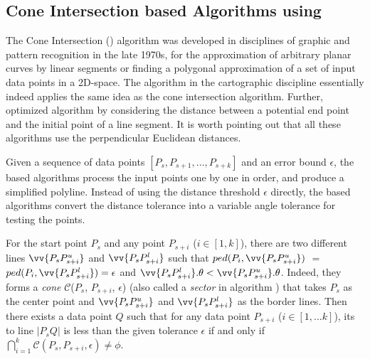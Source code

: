 \subsection{Cone Intersection based Algorithms using \ped}


The Cone Intersection (\cia) algorithm \cite{Williams:Longest, Sklansky:Cone} was developed in disciplines of graphic and pattern recognition in the late 1970s, for the approximation of arbitrary planar curves by linear segments or finding a polygonal approximation of a set of input data points in a 2D-space. The \sleeve algorithm \cite{Zhao:Sleeve} in the cartographic discipline essentially indeed applies the same idea as the cone intersection algorithm.
Further, \cite{Dunham:Cone}  optimized algorithm \cia by considering the distance between a potential end point and the initial point of a line segment. It is worth pointing out that all these algorithms use the perpendicular Euclidean distances.


Given a sequence of data points $[P_{s}, P_{s+1}, \ldots, P_{s+k}]$ and an error bound $\epsilon$, the \cia based algorithms process the input points one by one in order, and produce a simplified polyline.  Instead of using the distance threshold $\epsilon$ directly, the \cia based algorithms convert the distance tolerance into a variable angle tolerance for testing the points.

For the start point $P_s$ and any point $P_{s+i}$ ($i\in[1, k]$), there are two different lines $\vv{P_sP^u_{s+i}}$ and $\vv{P_sP^l_{s+i}}$ such that $ped(P_i, \vv{P_sP^u_{s+i}})$ $=$ $ped(P_i, \vv{P_sP^l_{s+i}}) = \epsilon$ and $\vv{P_sP^l_{s+i}}.\theta < \vv{P_sP^u_{s+i}}.\theta$. Indeed, they forms a \emph{cone} $\mathcal{C}$($P_s$, $P_{s+i}$, $\epsilon$) (also called a \emph{sector} in algorithm \sleeve \cite{Zhao:Sleeve}) that takes $P_s$ as the center point and $\vv{P_sP^u_{s+i}}$ and $\vv{P_sP^l_{s+i}}$ as the border lines.
Then there exists a data point $Q$ such that for any data point $P_{s+i}$ ($i \in [1, ... k]$), its \ped to
line $|P_sQ|$ is less than the given \ped tolerance $\epsilon$ if and only if $\bigcap_{i=1}^{k}\mathcal{C}(P_s, P_{s+i}, \epsilon) \ne \phi$.

